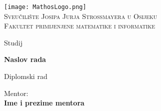 \documentclass{mathos}
\begin{document}
\renewcommand\bibname{Literatura}

\sloppy

\begin{titlepage}
\begin{center}
    \texttt{[image: MathosLogo.png]} \\ \vspace{1mm}
       \textsc{Sveučilište Josipa Jurja Strossmayera u Osijeku} \\
    \vspace{2mm}
    \textsc{Fakultet primijenjene matematike i informatike}
\end{center}

\begin{center}

    \vspace{4mm}
     {Studij} %


\end{center}

\vspace{25mm}
\begin{center}
    {\LARGE{\bf  Naslov rada}}

    \vspace{15mm}
    {\large{\sc Diplomski rad}}


\end{center}

\vspace{50mm}

\begin{minipage}[t]{0.47\textwidth}
	{Mentor:} \normalsize\vspace{3mm} %
	{\bf\\ \large{Ime i prezime mentora}}



\end{minipage}
\end{titlepage}
\end{document}

